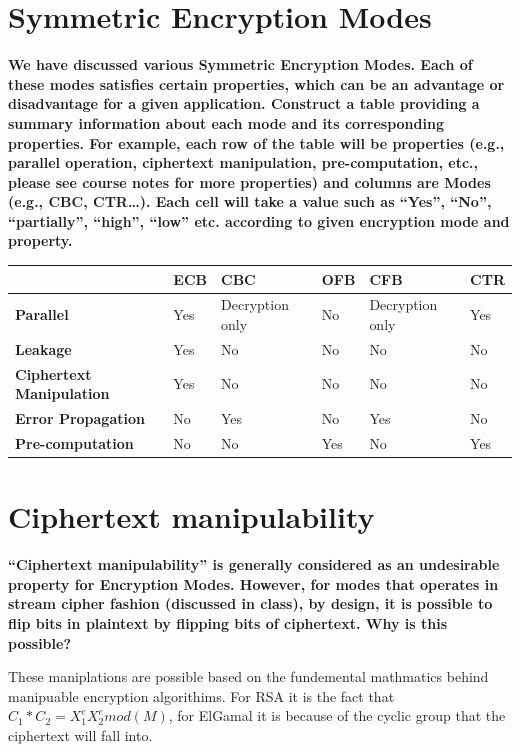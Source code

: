 \documentclass[letterpaper,11pt,notitlepage,fleqn]{article}
\begin{document}
\section{Symmetric Encryption Modes}
\noindent \textbf{We have discussed various Symmetric Encryption Modes. Each of  these modes  satisfies certain properties, which can be  an  advantage or disadvantage  for  a given  application. Construct a  table providing a  summary  information  about  each mode and  its corresponding properties. For example,  each  row  of  the  table  will  be  properties  (e.g.,  parallel  operation,  ciphertext manipulation,  pre-computation,  etc.,  please  see  course  notes  for  more  properties)  and  columns are  Modes  (e.g.,  CBC,  CTR…).  Each  cell  will  take  a  value  such  as  “Yes”,  “No”,  “partially”, “high”, “low” etc. according to given encryption mode and property.}
\begin{center}
\begin{tabular}{|l|l|l|l|l|l|}
    \hline
    & \textbf{ECB} & \textbf{CBC} & \textbf{OFB} & \textbf{CFB} & \textbf{CTR} \\ \hline
    \textbf{Parallel} & Yes & Decryption only & No & Decryption only & Yes \\ \hline
    \textbf{Leakage} & Yes & No & No & No & No \\ \hline
    \textbf{Ciphertext Manipulation} & Yes & No & No & No & No \\ \hline
    \textbf{Error Propagation} & No & Yes & No & Yes & No \\ \hline
    \textbf{Pre-computation} & No & No & Yes & No & Yes \\ \hline
\end{tabular}
\end{center}
\section{Ciphertext  manipulability}
\noindent \textbf{“Ciphertext  manipulability”  is  generally  considered  as  an  undesirable  property  for Encryption  Modes.  However,  for  modes  that  operates  in  stream  cipher  fashion  (discussed  in class), by design, it is possible to flip bits in plaintext by flipping bits of ciphertext. Why is this possible?}

These maniplations are possible based on the fundemental mathmatics behind manipuable encryption algorithims. For RSA it is the fact that $C_{1} \ast C_{2} = X_{1}^{e}X_{2}^{e}mod(M)$, for ElGamal it is because of the cyclic group that the ciphertext will fall into. 
\end{document}
